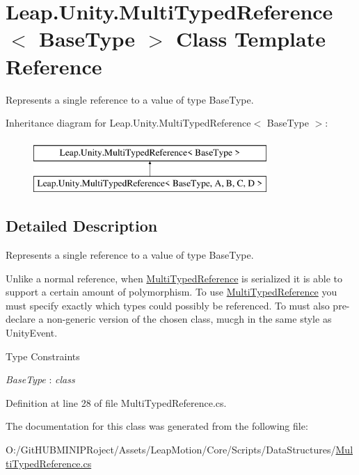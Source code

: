 \hypertarget{class_leap_1_1_unity_1_1_multi_typed_reference}{}\section{Leap.\+Unity.\+Multi\+Typed\+Reference$<$ Base\+Type $>$ Class Template Reference}
\label{class_leap_1_1_unity_1_1_multi_typed_reference}


Represents a single reference to a value of type Base\+Type.  


Inheritance diagram for Leap.\+Unity.\+Multi\+Typed\+Reference$<$ Base\+Type $>$\+:\begin{figure}[H]
\begin{center}
\leavevmode
\includegraphics[height=2.000000cm]{class_leap_1_1_unity_1_1_multi_typed_reference}
\end{center}
\end{figure}


\subsection{Detailed Description}
Represents a single reference to a value of type Base\+Type. 

Unlike a normal reference, when \mbox{\hyperlink{class_leap_1_1_unity_1_1_multi_typed_reference}{Multi\+Typed\+Reference}} is serialized it is able to support a certain amount of polymorphism. To use \mbox{\hyperlink{class_leap_1_1_unity_1_1_multi_typed_reference}{Multi\+Typed\+Reference}} you must specify exactly which types could possibly be referenced. To must also pre-\/declare a non-\/generic version of the chosen class, mucgh in the same style as Unity\+Event. \begin{Desc}
\item[Type Constraints]\begin{description}
\item[{\em Base\+Type} : {\em class}]\end{description}
\end{Desc}


Definition at line 28 of file Multi\+Typed\+Reference.\+cs.



The documentation for this class was generated from the following file\+:\begin{DoxyCompactItemize}
\item 
O\+:/\+Git\+H\+U\+B\+M\+I\+N\+I\+P\+Roject/\+Assets/\+Leap\+Motion/\+Core/\+Scripts/\+Data\+Structures/\mbox{\hyperlink{_multi_typed_reference_8cs}{Multi\+Typed\+Reference.\+cs}}\end{DoxyCompactItemize}
